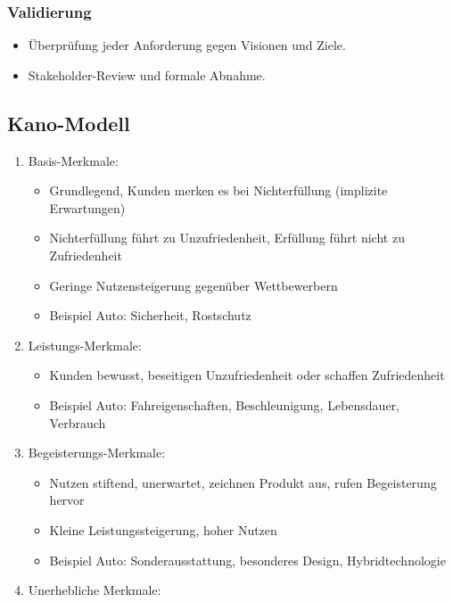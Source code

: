 \documentclass[11pt, a4paper]{article}
\begin{document}
\subsubsection*{Validierung}
\begin{itemize}
    \item Überprüfung jeder Anforderung gegen Visionen und Ziele.
    \item Stakeholder-Review und formale Abnahme.
\end{itemize}

\newpage


\subsection{Kano-Modell}

\begin{enumerate}
    \item Basis-Merkmale:
    \begin{itemize}
        \item Grundlegend, Kunden merken es bei Nichterfüllung (implizite Erwartungen)
        \item Nichterfüllung führt zu Unzufriedenheit, Erfüllung führt nicht zu Zufriedenheit
        \item Geringe Nutzensteigerung gegenüber Wettbewerbern
        \item Beispiel Auto: Sicherheit, Rostschutz
    \end{itemize}
    \item Leistungs-Merkmale:
    \begin{itemize}
        \item Kunden bewusst, beseitigen Unzufriedenheit oder schaffen Zufriedenheit
        \item Beispiel Auto: Fahreigenschaften, Beschleunigung, Lebensdauer, Verbrauch
    \end{itemize}
    \item Begeisterungs-Merkmale:
    \begin{itemize}
        \item Nutzen stiftend, unerwartet, zeichnen Produkt aus, rufen Begeisterung hervor
        \item Kleine Leistungssteigerung, hoher Nutzen
        \item Beispiel Auto: Sonderausstattung, besonderes Design, Hybridtechnologie
    \end{itemize}
    \item Unerhebliche Merkmale:
    \begin{itemize}

\end{itemize}
\end{enumerate}
\end{document}
